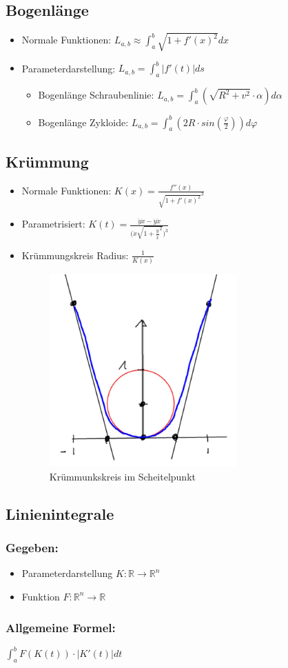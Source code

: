 \subsection{Bogenlänge}
\begin{itemize}
	\item Normale Funktionen: $L_{a,b} \approx \int_a^b \sqrt{1+f'(x)^2} dx$
	\item Parameterdarstellung:
	$L_{a,b} = \int_a^b |f'(t)| ds$
	\begin{itemize}
		\item Bogenlänge Schraubenlinie:
		$L_{a,b} = \int_a^b (\sqrt{R^2 + v^2}\cdot \alpha ) d\alpha$
		\item Bogenlänge Zykloide:
		$L_{a,b} = \int_a^b (2 R\cdot sin(\frac{\varphi}{2})) d\varphi$
	\end{itemize}
\end{itemize}

\subsection{Krümmung}
\begin{itemize}
	\item Normale Funktionen: $K(x) = \frac{f''(x)}{\sqrt{1+f'(x)^2}^3}$
	\item Parametrisiert: 
	$K(t) = \frac
		{\ddot{y} \dot{x} - \dot{y} \ddot{x}}
		{\big ( \dot{x} \sqrt{1 + \frac{ \dot{y} }{ \dot{x} }^2} \big )^3}
	$
	\item Krümmungskreis Radius: $\frac{1}{K(x)}$ \\
	\begin{figure}[h!]
		\centering
		\includegraphics[scale=.5]{pics/kruemmungskreis}
		\caption{Krümmunkskreis im Scheitelpunkt}
	\end{figure}
\end{itemize}

\pagebreak

\subsection{Linienintegrale}
\subsubsection{Gegeben:}
\begin{itemize}
	\item Parameterdarstellung $K: \mathbb{R} \rightarrow \mathbb{R}^n$
	\item Funktion $F: \mathbb{R}^n \rightarrow \mathbb{R}$
\end{itemize}

\subsubsection{Allgemeine Formel:}
$\int_a^b F(K(t)) \cdot |K'(t)| dt$